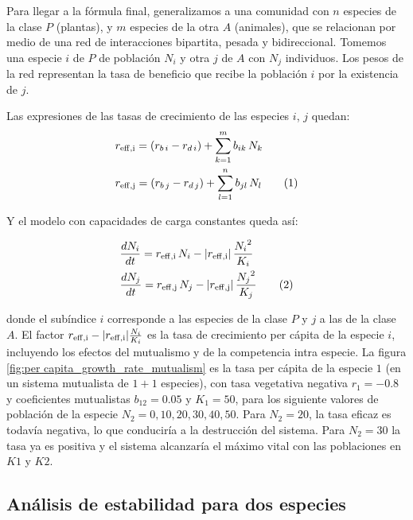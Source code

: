 Para llegar a la fórmula final, generalizamos a una comunidad con $n$ especies de la clase $P$ (plantas), y $m$ especies de la otra $A$ (animales), que se relacionan por medio de una red de interacciones bipartita, pesada y bidireccional. Tomemos una especie $i$ de $P$ de población $N_i$ y otra $j$ de $A$ con $N_j$ individuos. Los pesos de la red representan la tasa de beneficio que recibe la población $i$ por la existencia de $j$. 

Las expresiones de las tasas de crecimiento de las especies $i$, $j$ quedan:
\begin{align*}
\displaystyle & r_{\rm{eff},i}  = \left( r_{b\, i} - r_{d\, i} \right) + \sum\limits_{k=1}^{m} b_{ik}\, N_k  \\
\displaystyle & r_{\rm{eff},j}  = \left( r_{b\, j} - r_{d\, j} \right) + \sum\limits_{l=1}^{n} b_{jl}\, N_l
\stepcounter{equation}\tag{\theequation}\label{modelors}
\end{align*}

Y el modelo con capacidades de carga constantes queda así:

\begin{theo}
\begin{align*}
\displaystyle
&\frac{dN_i}{dt}=r_{\rm{eff},i}\, N_i - |r_{\rm{eff},i}| \, \frac{{N_i}^2}{K_i}  \\
\displaystyle
&\frac{dN_j}{dt}=r_{\rm{eff},j} \, N_j - |r_{\rm{eff},j}| \, \frac{{N_j}^2}{K_j}
\stepcounter{equation}\tag{\theequation}\label{eq:modelo_optionI}
\end{align*}
\end{theo}

\noindent donde el subíndice $i$ corresponde a las especies de la clase $P$ y $j$ a las de la clase $A$. El factor $r_{\rm{eff},i} - |r_{\rm{eff},i}| \frac{N_i}{K_i}$ es la tasa de crecimiento per cápita de la especie $i$, incluyendo los efectos del mutualismo y de la competencia intra especie. La figura \ref{fig:per capita_growth_rate_mutualism} es la tasa per cápita de la especie $1$ (en un sistema mutualista de $1+1$ especies),
con tasa vegetativa negativa $r_1=-0.8$ y coeficientes mutualistas $b_{12}=0.05$ y $K_1=50$, para los siguiente valores de población de la especie $N_2=0,10,20,30,40,50$. Para $N_2=20$, la tasa eficaz es todavía negativa, lo que conduciría a la destrucción del sistema. Para
$N_2=30$ la tasa ya es positiva y el sistema alcanzaría el máximo vital con las poblaciones en $K1$ y $K2$.

\subsection{Análisis de estabilidad para dos especies}


